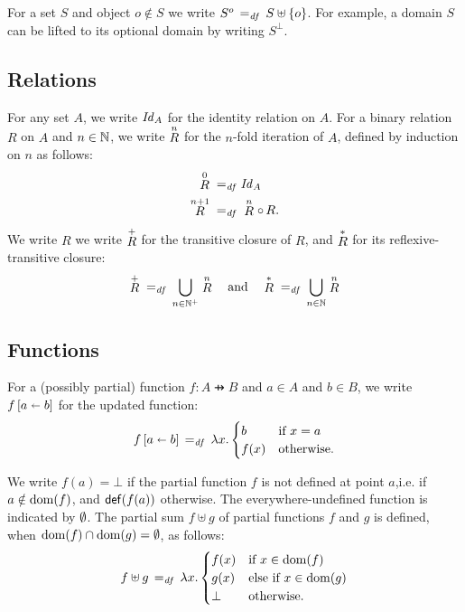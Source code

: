 \documentclass[11pt]{report}
\begin{document}
For a set $S$ and object $o \notin S$ we write $S^o \eqdef S \uplus \set{o}$. For example, a domain $S$ can be lifted to its optional domain by writing $S^\bot$. 

\subsection{Relations}
\label{sec:relations}

For any set $A$, we write $\ident{A}$ for the identity relation on $A$. For a binary relation $R$ on $A$ and $n \in \setnaturals$, we write $\relexp{R}{n}$ for the $n$-fold iteration of $A$, defined by induction on $n$ as follows: \begin{align*} \relexp{R}{0} \eqdef &\ident{A} \\ 
\relexp{R}{n+1} \eqdef & \relexp{R}{n} \rcomp R.\end{align*} We write $R$ we write $\tcl{R}$ for the transitive closure of $R$, and $\rtcl{R}$ for its reflexive-transitive closure: \begin{align*}
    \tcl{R} \eqdef \bigcup_{n \in \setpositives} \relexp{R}{n} \text{~~~and~~~}
    \rtcl{R} \eqdef \bigcup_{n \in \setnaturals} \relexp{R}{n} 
\end{align*}

\subsection{Functions}
\label{sec:functions}

For a (possibly partial) function $f : A \pfun B$ and $a \in A$ and $b \in B$, we write $\funup{f}{\ptup{a}{b}}$ for the updated function: \[ \funup{f}{\ptup{a}{b}} \eqdef \lambda x . \begin{cases}
	b & \text{if $x = a$} \\
	f(x) & \text{otherwise.}
\end{cases}\] 

We write $f(a) = \bot$ if the partial function $f$ is not defined at point $a$,i.e. if $a \notin \dom{f}$, and $\defined{f(a)}$ otherwise. The everywhere-undefined function is indicated by $\nil$. The partial sum $f \uplus g$ of partial functions $f$ and $g$ is defined, when $\dom{f} \cap \dom{g} = \nil$, as follows: \[ f \uplus g \eqdef \lambda x . \begin{cases}
    f(x) & \text{if $x \in \dom{f}$} \\
    g(x) & \text{else if $x \in \dom{g}$} \\
    \bot & \text{otherwise.}
\end{cases}\]
\end{document}
